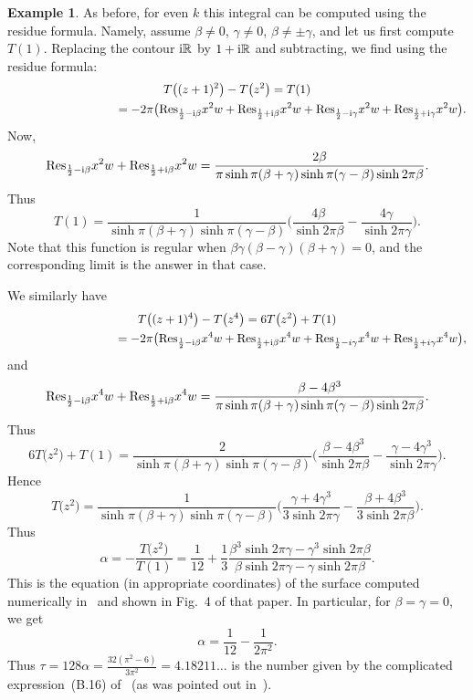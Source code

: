\documentclass[10pt,a4paper]{amsart}
\theoremstyle{definition}
\newtheorem{Example}[Theorem]{Example}
\numberwithin{equation}{section}
\begin{document}
\begin{Example}
As before, for even $k$ this integral can be computed using the residue formula. Namely, assume $\beta\ne 0$, $\gamma\ne 0$, $\beta\ne \pm \gamma$, and let us first compute $T(1)$. Replacing the contour ${\rm i}\mathbb R$ by $1+{\rm i}\mathbb R$ and subtracting, we find using the residue formula:
\begin{gather*}
T\big((z+1)^2\big)-T\big(z^2\big)=T(1)
\\ \hphantom{T\big((z+1)^2\big)-T\big(z^2\big)}
{}=-2\pi\big({\rm Res}_{\frac{1}{2}-{\rm i}\beta }x^2w+{\rm Res}_{\frac{1}{2}+{\rm i}\beta }x^2w+{\rm Res}_{\frac{1}{2}-{\rm i}\gamma}x^2w+{\rm Res}_{\frac{1}{2}+{\rm i}\gamma}x^2w\big).
\end{gather*}
Now,
\[
{\rm Res}_{\frac{1}{2}-{\rm i}\beta }x^2w+{\rm Res}_{\frac{1}{2}+{\rm i}\beta }x^2w=\frac{2\beta}{\pi \sinh \pi(\beta+\gamma)\sinh\pi(\gamma-\beta)\sinh 2\pi \beta}.
\]
Thus
\[
T(1)=\frac{1}{\sinh \pi(\beta+\gamma)\sinh\pi(\gamma-\beta)}\bigg(\frac{4\beta}{\sinh 2\pi \beta}-\frac{4\gamma}{\sinh 2\pi \gamma}\bigg).
\]
Note that this function is regular when $\beta\gamma(\beta-\gamma)(\beta+\gamma)=0$, and the corresponding limit is the answer in that case.

We similarly have
\begin{gather*}
T\big((z+1)^4\big)-T\big(z^4\big)=6T\big(z^2\big)+T(1)
\\ \hphantom{T\big((z+1)^4\big)-T\big(z^4\big)}
{}=-2\pi\big({\rm Res}_{\frac{1}{2}-{\rm i}\beta }x^4w+{\rm Res}_{\frac{1}{2}+{\rm i}\beta }x^4w+{\rm Res}_{\frac{1}{2}-i\gamma}x^4w+{\rm Res}_{\frac{1}{2}+i\gamma}x^4w\big),
\end{gather*}
and
\[
{\rm Res}_{\frac{1}{2}-{\rm i}\beta }x^4w+{\rm Res}_{\frac{1}{2}+{\rm i}\beta }x^4w=\frac{\beta-4\beta^3}{\pi \sinh \pi(\beta+\gamma)\sinh\pi(\gamma-\beta)\sinh 2\pi \beta}.
\]
Thus
\[
6T\big(z^2\big)+T(1)=\frac{2}{\sinh \pi(\beta+\gamma)\sinh\pi(\gamma-\beta)}\bigg(\frac{\beta-4\beta^3}{\sinh 2\pi \beta}-\frac{\gamma-4\gamma^3}{\sinh 2\pi \gamma}\bigg).
\]
Hence
\[
T\big(z^2\big)=\frac{1}{\sinh \pi(\beta+\gamma)\sinh\pi(\gamma-\beta)}\bigg(\frac{\gamma+4\gamma^3}{3\sinh 2\pi \gamma}-\frac{\beta+4\beta^3}{3\sinh 2\pi \beta}\bigg).
\]
Thus
\[
\alpha=-\frac{T\big(z^2\big)}{T(1)}=\frac{1}{12}+\frac{1}{3}\frac{\beta^3\sinh 2\pi \gamma-\gamma^3\sinh 2\pi \beta}{\beta\sinh 2\pi \gamma-\gamma\sinh 2\pi \beta}.
\]
This is the equation (in appropriate coordinates) of the surface computed numerically in~\cite{BPR} and shown in Fig.~4 of that paper.
In particular, for $\beta=\gamma=0$, we get
\[
\alpha=\frac{1}{12}-\frac{1}{2\pi^2}.
\]
Thus $\tau=128\alpha=\frac{32(\pi^2-6)}{3\pi^2}=4.18211{\dots}$
is the number given by the complicated expres\-sion~(B.16) of~\cite{BPR}
(as was pointed out in~\cite{DPY}).
\end{Example}
\end{document}
